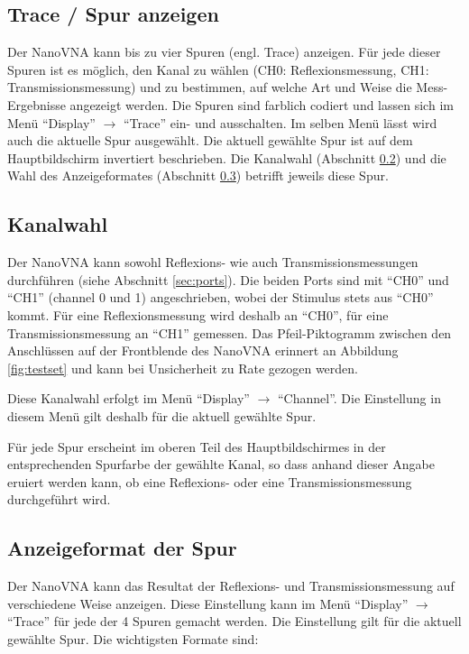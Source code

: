 \documentclass[twoside,a4paper,11pt,halfparskip,DIV=11,notitlepage]{scrartcl}
\begin{document}
\subsection{Trace / Spur anzeigen}
Der NanoVNA kann bis zu vier Spuren (engl. Trace) anzeigen. Für jede dieser Spuren
ist es möglich, den Kanal zu wählen (CH0: Reflexionsmessung, CH1:
Transmissionsmessung) und zu bestimmen, auf welche Art und Weise die Mess-Ergebnisse
angezeigt werden. Die Spuren sind farblich codiert und lassen sich im Menü
``Display'' $\longrightarrow$ ``Trace'' ein- und ausschalten. Im selben Menü
lässt wird auch die aktuelle Spur ausgewählt. Die aktuell gewählte Spur ist auf dem
Hauptbildschirm invertiert beschrieben. Die Kanalwahl (Abschnitt
\ref{sec:nanovnachannel}) und die Wahl des Anzeigeformates (Abschnitt \ref{sec:nanovnaformat})
betrifft jeweils diese Spur.

\subsection{Kanalwahl}\label{sec:nanovnachannel}
Der NanoVNA kann sowohl Reflexions- wie auch Transmissionsmessungen durchführen
(siehe Abschnitt \ref{sec:ports}). Die beiden Ports sind mit ``CH0'' und ``CH1''
(channel 0 und 1) angeschrieben, wobei der Stimulus stets aus ``CH0'' kommt.
Für eine Reflexionsmessung wird deshalb an ``CH0'', für eine Transmissionsmessung
an ``CH1'' gemessen. Das Pfeil-Piktogramm zwischen den Anschlüssen auf der
Frontblende des NanoVNA erinnert an Abbildung \ref{fig:testset}
und kann bei Unsicherheit zu Rate gezogen werden.

Diese Kanalwahl erfolgt im Menü ``Display'' $\longrightarrow$ ``Channel''.
Die Einstellung in diesem Menü gilt deshalb für die aktuell gewählte Spur.

Für jede Spur erscheint im oberen Teil des Hauptbildschirmes in der
entsprechenden Spurfarbe der gewählte Kanal, so dass anhand dieser Angabe
eruiert werden kann, ob eine Reflexions- oder eine Transmissionsmessung
durchgeführt wird.

\subsection{Anzeigeformat der Spur}\label{sec:nanovnaformat}
Der NanoVNA kann das Resultat der Reflexions- und Transmissionsmessung auf verschiedene
Weise anzeigen. Diese Einstellung kann im Menü ``Display'' $\longrightarrow$ ``Trace''
für jede der 4 Spuren gemacht werden. Die Einstellung gilt für die aktuell gewählte
Spur. Die wichtigsten Formate sind:
\end{document}
